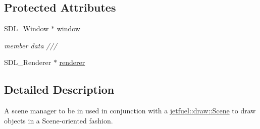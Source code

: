 \subsection*{Protected Attributes}
\begin{DoxyCompactItemize}
\item 
S\+D\+L\+\_\+\+Window $\ast$ \hyperlink{classjetfuel_1_1draw_1_1Scene__manager_a7613c251e515e82f62b87126a92b33b4}{window}
\begin{DoxyCompactList}\small\item\em member data /// \end{DoxyCompactList}\item 
S\+D\+L\+\_\+\+Renderer $\ast$ \hyperlink{classjetfuel_1_1draw_1_1Scene__manager_a34a22a19dd956074c9101f25414e3e1c}{renderer}
\end{DoxyCompactItemize}


\subsection{Detailed Description}
A scene manager to be in used in conjunction with a \hyperlink{classjetfuel_1_1draw_1_1Scene}{jetfuel\+::draw\+::\+Scene} to draw objects in a Scene-\/oriented fashion.


